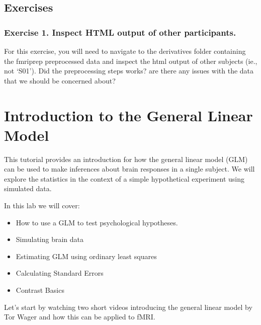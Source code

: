 \documentclass[letterpaper,10pt,english]{sphinxmanual}
\begin{document}
\subsection{Exercises}
\label{\detokenize{content/Preprocessing:exercises}}

\subsubsection{Exercise 1. Inspect HTML output of other participants.}
\label{\detokenize{content/Preprocessing:exercise-1-inspect-html-output-of-other-participants}}
For this exercise, you will need to navigate to the derivatives folder containing the fmriprep preprocessed data  and inspect the html output of other subjects (ie., not ‘S01’). Did the preprocessing steps works? are there any issues with the data that we should be concerned about?


\section{Introduction to the General Linear Model}
\label{\detokenize{content/GLM:introduction-to-the-general-linear-model}}\label{\detokenize{content/GLM::doc}}

This tutorial provides an introduction for how the general linear model (GLM) can be used to make inferences about brain responses in a single subject. We will explore the statistics in the context of a simple hypothetical experiment using simulated data.

In this lab we will cover:
\begin{itemize}
\item {} 
How to use a GLM to test psychological hypotheses.

\item {} 
Simulating brain data

\item {} 
Estimating GLM using ordinary least squares

\item {} 
Calculating Standard Errors

\item {} 
Contrast Basics

\end{itemize}

Let’s start by watching two short videos introducing the general linear model by Tor Wager and how this can be applied to fMRI.
\end{document}

